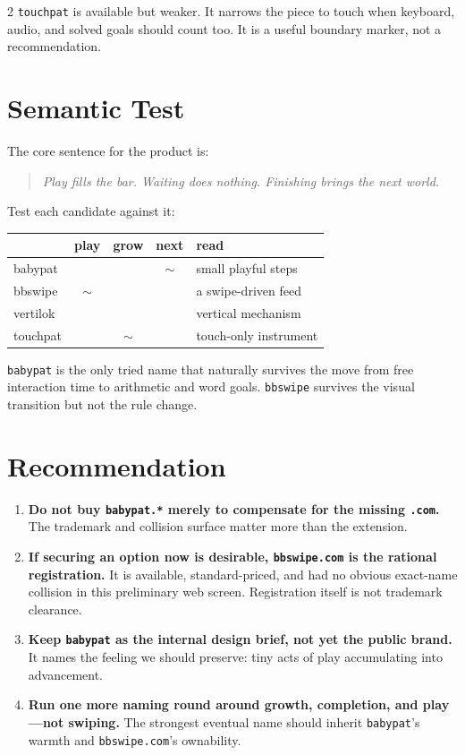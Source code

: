 \documentclass[9pt,letterpaper]{article}
\newcommand{\yes}{\textcolor{acgreen}{\ding{52}}}
\newcommand{\no}{\textcolor{acred}{\ding{56}}}
\begin{document}
\begin{multicols}{2}
\texttt{touchpat} is available but weaker. It narrows the piece to touch when keyboard, audio, and solved goals should count too. It is a useful boundary marker, not a recommendation.

\section{Semantic Test}

The core sentence for the product is:

\begin{quote}
\small\itshape Play fills the bar. Waiting does nothing. Finishing brings the next world.
\end{quote}

Test each candidate against it:

{\footnotesize
\begin{tabularx}{\columnwidth}{@{}lcccX@{}}
\toprule
& \textbf{play} & \textbf{grow} & \textbf{next} & \textbf{read} \\
\midrule
babypat & \yes & \yes & $\sim$ & small playful steps \\
bbswipe & $\sim$ & \no & \yes & a swipe-driven feed \\
vertilok & \no & \no & \yes & vertical mechanism \\
touchpat & \yes & $\sim$ & \no & touch-only instrument \\
\bottomrule
\end{tabularx}}

\texttt{babypat} is the only tried name that naturally survives the move from free interaction time to arithmetic and word goals. \texttt{bbswipe} survives the visual transition but not the rule change.

\section{Recommendation}

\begin{enumerate}
  \item \textbf{Do not buy \texttt{babypat.*} merely to compensate for the missing \texttt{.com}.} The trademark and collision surface matter more than the extension.
  \item \textbf{If securing an option now is desirable, \texttt{bbswipe.com} is the rational registration.} It is available, standard-priced, and had no obvious exact-name collision in this preliminary web screen. Registration itself is not trademark clearance.
  \item \textbf{Keep \texttt{babypat} as the internal design brief, not yet the public brand.} It names the feeling we should preserve: tiny acts of play accumulating into advancement.
  \item \textbf{Run one more naming round around growth, completion, and play---not swiping.} The strongest eventual name should inherit \texttt{babypat}'s warmth and \texttt{bbswipe.com}'s ownability.
\end{enumerate}


\end{multicols}
\end{document}
